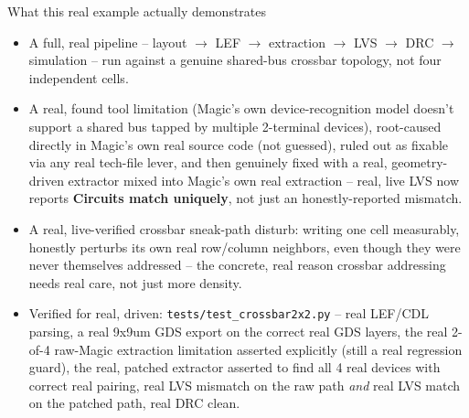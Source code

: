 \documentclass[aspectratio=169,9pt]{beamer}
\begin{document}
\begin{frame}{What this real example actually demonstrates}
\footnotesize
\begin{itemize}
  \item A full, real pipeline -- layout $\to$ LEF $\to$ extraction
        $\to$ LVS $\to$ DRC $\to$ simulation -- run against a genuine
        shared-bus crossbar topology, not four independent cells.
  \item A real, found tool limitation (Magic's own device-recognition
        model doesn't support a shared bus tapped by multiple
        2-terminal devices), root-caused directly in Magic's own real
        source code (not guessed), ruled out as fixable via any real
        tech-file lever, and then genuinely fixed with a real,
        geometry-driven extractor mixed into Magic's own real
        extraction -- real, live LVS now reports \textbf{Circuits
        match uniquely}, not just an honestly-reported mismatch.
  \item A real, live-verified crossbar sneak-path disturb: writing one
        cell measurably, honestly perturbs its own real row/column
        neighbors, even though they were never themselves addressed --
        the concrete, real reason crossbar addressing needs real care,
        not just more density.
  \item Verified for real, driven: \texttt{tests/test\_crossbar2x2.py}
        -- real LEF/CDL parsing, a real 9x9um GDS export on the
        correct real GDS layers, the real 2-of-4 raw-Magic extraction
        limitation asserted explicitly (still a real regression guard),
        the real, patched extractor asserted to find all 4 real
        devices with correct real pairing, real LVS mismatch on the
        raw path \emph{and} real LVS match on the patched path, real
        DRC clean.
\end{itemize}
\end{frame}
\end{document}
